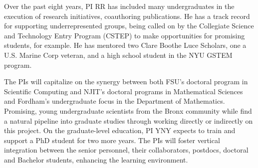 Over the past eight years, PI RR has included many undergraduates in
the execution of research initiatives, coauthoring publications. He has
a track record for supporting underrepresented groups, being called on
by the Collegiate Science and Technology Entry Program (CSTEP) to make
opportunities for promising students, for example. He has mentored two
Clare Boothe Luce Scholars, one a U.S. Marine Corp veteran, and a high
school student in the NYU GSTEM program. 

The PIs will capitalize on the synergy between both FSU's doctoral program in Scientific Computing and NJIT's doctoral programs
in Mathematical Sciences and Fordham's undergraduate focus in the
Department of Mathematics. Promising, young undergraduate scientists
from the Bronx community while find a natural pipeline into graduate
studies through working directly or indirectly on this project. On the
graduate-level education, PI YNY expects to train and
support a PhD student for
two more years. 
The PIs will foster vertical integration between the senior personnel, their
collaborators, postdocs, doctoral and Bachelor students, enhancing the
learning environment.
%


%
%


